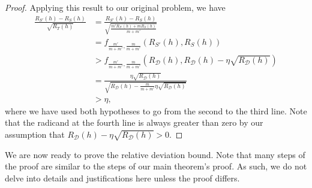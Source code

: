 \documentclass[twoside,11pt]{article}
\newcommand{\D}{\mathcal{D}}
\begin{document}
\begin{proof}
Applying this result to our original problem, we have
\begin{align*}
    \frac{R_{S'}(h) - R_S(h)}{\sqrt{R_T(h)}}
    &= \frac{R_{S'}(h) - R_S(h)}{\sqrt{\frac{m' R_{S'}(h) + m R_S(h)}{m+m'}}}\\
    &= f_{\frac{m'}{m+m'}, \frac{m}{m+m'}}(R_{S'}(h), R_S(h))\\
    &> f_{\frac{m'}{m+m'}, \frac{m}{m+m'}}(R_\D(h), R_\D(h)-\eta\sqrt{R_\D(h)})\\
    &= \frac{\eta \sqrt{R_\D(h)}}{\sqrt{ R_\D(h) - \frac{m}{m+m'}\eta\sqrt{R_\D(h)} }}\\
    &> \eta,
\end{align*}
where we have used both hypotheses to go from the second to the third line.
Note that the radicand at the fourth line is always greater than zero by our assumption that $R_\D(h)- \eta \sqrt{R_\D(h)} > 0$.
\end{proof}


We are now ready to prove the relative deviation bound.
Note that many steps of the proof are similar to the steps of our main theorem's proof.
As such, we do not delve into details and justifications here unless the proof differs.
\end{document}
